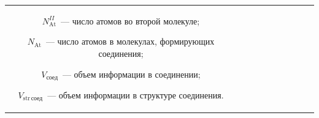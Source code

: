 \begin{table}
\begin{center}
\begin{tabular}{|c|c|c|c|c|c|c|c|c|c|}
{$N^{II}_{\mathrm{At}}$~--- число атомов во второй молекуле;


$N_{\mathrm{At}}$~--- число атомов в молекулах, формирующих соединения;


$V_{\mathrm{соед}}$~--- объем информации в соединении;


$V_{\mathrm{str\,соед}}$~--- объем информации в структуре соединения.}


\end{tabular}


\end{center}


\vspace*{-6.27054pt}


\end{table}





